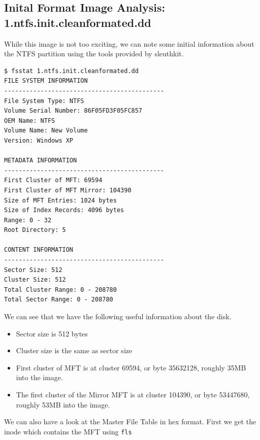 \documentclass[a4paper,
    11pt,
    normalheadings,
    parindent,
    UKenglish,
    abstracton,
    ]{scrartcl}
\begin{document}
\subsection{Inital Format Image Analysis: 1.ntfs.init.cleanformated.dd }
While this image is not too exciting, we can note some initial information about the NTFS partition using the tools provided by sleuthkit.

\begin{verbatim}
$ fsstat 1.ntfs.init.cleanformated.dd
FILE SYSTEM INFORMATION
--------------------------------------------
File System Type: NTFS
Volume Serial Number: 86F05FD3F05FC857
OEM Name: NTFS
Volume Name: New Volume
Version: Windows XP

METADATA INFORMATION
--------------------------------------------
First Cluster of MFT: 69594
First Cluster of MFT Mirror: 104390
Size of MFT Entries: 1024 bytes
Size of Index Records: 4096 bytes
Range: 0 - 32
Root Directory: 5

CONTENT INFORMATION
--------------------------------------------
Sector Size: 512
Cluster Size: 512
Total Cluster Range: 0 - 208780
Total Sector Range: 0 - 208780
\end{verbatim}
We can see that we have the following useful information about the disk.
\begin{itemize}
        \item Sector size is 512 bytes
        \item Cluster size is the same as sector size
        \item First cluster of MFT is at cluster 69594, or byte 35632128, roughly 35MB into the image.
        \item The first cluster of the Mirror MFT is at cluster 104390, or byte 53447680, roughly 53MB into the image.
\end{itemize}

We can also have a look at the Master File Table in hex format. First we get the inode which contains the MFT using \texttt{fls}
\end{document}
